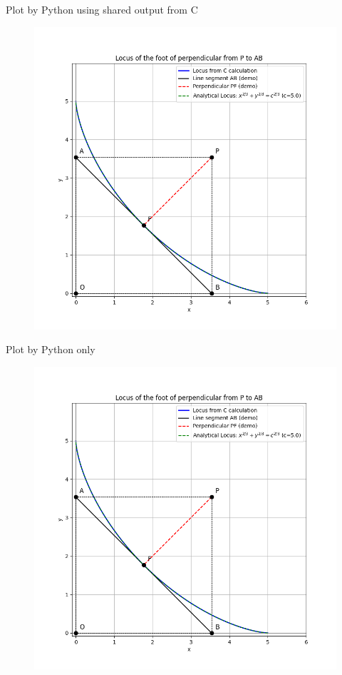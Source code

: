 \documentclass{beamer}
\begin{document}
\begin{frame}{Plot by Python using shared output from C}
\begin{figure}[H]
\centering
\includegraphics[width=0.8\columnwidth]{../figs/fig1.png}
\caption{}
\label{fig:1}
\end{figure}
\end{frame}

\begin{frame}{Plot by Python only}
\begin{figure}[H]
\centering
\includegraphics[width=0.8\columnwidth]{../figs/fig2.png}
\caption{}
\label{fig:2}
\end{figure}
\end{frame}
\end{document}
